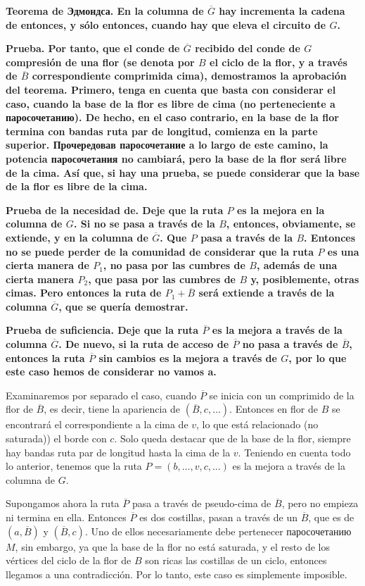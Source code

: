 \bf{Teorema de Эдмондса}. En la columna de $\overline G$ hay incrementa la cadena de entonces, y sólo entonces, cuando hay que eleva el circuito de $G$.

\bf{Prueba}. Por tanto, que el conde de $\overline G$ recibido del conde de $G$ compresión de una flor (se denota por $B$ el ciclo de la flor, y a través de $\overline B$ correspondiente comprimida cima), demostramos la aprobación del teorema. Primero, tenga en cuenta que basta con considerar el caso, cuando la base de la flor es libre de cima (no perteneciente a паросочетанию). De hecho, en el caso contrario, en la base de la flor termina con bandas ruta par de longitud, comienza en la parte superior. Прочередовав паросочетание a lo largo de este camino, la potencia паросочетания no cambiará, pero la base de la flor será libre de la cima. Así que, si hay una prueba, se puede considerar que la base de la flor es libre de la cima.

\bf{Prueba de la necesidad de}. Deje que la ruta $P$ es la mejora en la columna de $G$. Si no se pasa a través de la $B$, entonces, obviamente, se extiende, y en la columna de $\overline G$. Que $P$ pasa a través de la $B$. Entonces no se puede perder de la comunidad de considerar que la ruta $P$ es una cierta manera de $P_1$, no pasa por las cumbres de $B$, además de una cierta manera $P_2$, que pasa por las cumbres de $B$ y, posiblemente, otras cimas. Pero entonces la ruta de $P_1 + \overline B$ será extiende a través de la columna $\overline G$, que se quería demostrar.

\bf{Prueba de suficiencia}. Deje que la ruta $\overline P$ es la mejora a través de la columna $\overline G$. De nuevo, si la ruta de acceso de $\overline P$ no pasa a través de $\overline B$, entonces la ruta $\overline P$ sin cambios es la mejora a través de $G$, por lo que este caso hemos de considerar no vamos a.

Examinaremos por separado el caso, cuando $\overline P$ se inicia con un comprimido de la flor de $\overline B$, es decir, tiene la apariencia de $(\overline B, c, \ldots)$. Entonces en flor de $B$ se encontrará el correspondiente a la cima de $v$, lo que está relacionado (no saturada)) el borde con $c$. Solo queda destacar que de la base de la flor, siempre hay bandas ruta par de longitud hasta la cima de la $v$. Teniendo en cuenta todo lo anterior, tenemos que la ruta $P = (b, \ldots, v, c, ...)$ es la mejora a través de la columna de $G$.

Supongamos ahora la ruta $\overline P$ pasa a través de pseudo-cima de $\overline B$, pero no empieza ni termina en ella. Entonces $\overline P$ es dos costillas, pasan a través de un $\overline B$, que es de $(a, \overline B)$ y $(\overline B, c)$. Uno de ellos necesariamente debe pertenecer паросочетанию $M$, sin embargo, ya que la base de la flor no está saturada, y el resto de los vértices del ciclo de la flor de $B$ son ricas las costillas de un ciclo, entonces llegamos a una contradicción. Por lo tanto, este caso es simplemente imposible.

